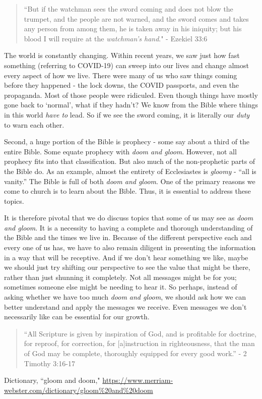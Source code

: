 \documentclass[10pt]{article}
\begin{document}
\begin{multicols}{2}
\begin{quotation}
	``But if the watchman sees the sword coming and does not blow the trumpet, and the people are not warned, and the sword comes and takes any person from among them, he is taken away in his iniquity; but his blood I will require at the \textit{watchman’s hand}." - Ezekiel 33:6
\end{quotation}

The world is constantly changing. Within recent years, we saw just how fast something (referring to COVID-19) can sweep into our lives and change almost every aspect of how we live. There were many of us who saw things coming before they happened - the lock downs, the COVID passports, and even the propaganda. Most of those people were ridiculed. Even though things have mostly gone back to `normal', what if they hadn't? We know from the Bible where things in this world \textit{have to} lead. So if we see the sword coming, it is literally our \textit{duty} to warn each other.

Second, a huge portion of the Bible is prophecy - some say about a third of the entire Bible. Some equate prophecy with \textit{doom and gloom}. However, not all prophecy fits into that classification. But also much of the non-prophetic parts of the Bible do. As an example, almost the entirety of Ecclesiastes is \textit{gloomy} - ``all is vanity.'' The Bible is full of both \textit{doom and gloom}. One of the primary reasons we come to church is to learn about the Bible. Thus, it is essential to address these topics.

It is therefore pivotal that we do discuss topics that some of us may see as \textit{doom and gloom}. It is a necessity to having a complete and thorough understanding of the Bible and the times we live in. Because of the different perspective each and every one of us has, we have to also remain diligent in presenting the information in a way that will be receptive. And if we don't hear something we like, maybe we should just try shifting our perspective to see the value that might be there, rather than just shunning it completely. Not all messages might be for you; sometimes someone else might be needing to hear it. So perhaps, instead of asking whether we have too much \textit{doom and gloom}, we should ask how we can better understand and apply the messages we receive. Even messages we don't necessarily like can be essential for our growth.

\begin{quotation}
	``All Scripture is given by inspiration of God, and is profitable for doctrine, for reproof, for correction, for [a]instruction in righteousness, that the man of God may be complete, thoroughly equipped for every good work.'' - 2 Timothy 3:16-17
\end{quotation}

\begin{thebibliography}{9}
	{\footnotesize
	 Dictionary, ``gloom and doom," \url{https://www.merriam-webster.com/dictionary/gloom%20and%20doom}

	}
\end{thebibliography}

\end{multicols}


\end{document}
